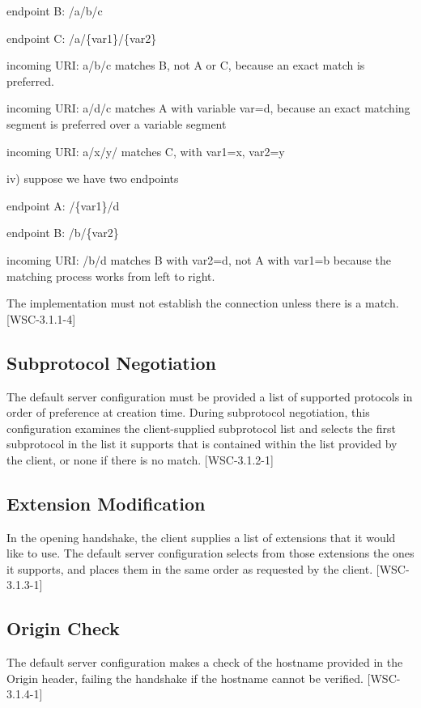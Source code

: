 endpoint B: /a/b/c

endpoint C: /a/\{var1\}/\{var2\}

incoming URI: a/b/c matches B, not A or C, because an exact match is preferred.

incoming URI: a/d/c matches A with variable var=d, because an exact matching segment is preferred over a variable segment

incoming URI: a/x/y/ matches C, with var1=x, var2=y


iv) suppose we have two endpoints

endpoint A: /\{var1\}/d

endpoint B: /b/\{var2\}

incoming URI: /b/d matches B with var2=d, not A with var1=b because the matching process works from left to right.


The implementation must not establish the connection unless there is a match. [WSC-3.1.1-4]

\subsection{Subprotocol Negotiation}

The default server configuration must be provided a list of supported protocols in order of preference at creation time. During subprotocol negotiation, this configuration examines the client-supplied subprotocol list and selects the first subprotocol in the list it supports that is contained within the list provided by the client, or none if there is no match. [WSC-3.1.2-1]

\subsection{Extension Modification}

In the opening handshake, the client supplies a list of extensions that it would like to use. The default server configuration selects from those extensions the ones it supports, and places them in the same order as requested by the client. [WSC-3.1.3-1]

\subsection{Origin Check}

The default server configuration makes a check of the hostname provided in the Origin header, failing the handshake if the hostname cannot be verified. [WSC-3.1.4-1]

